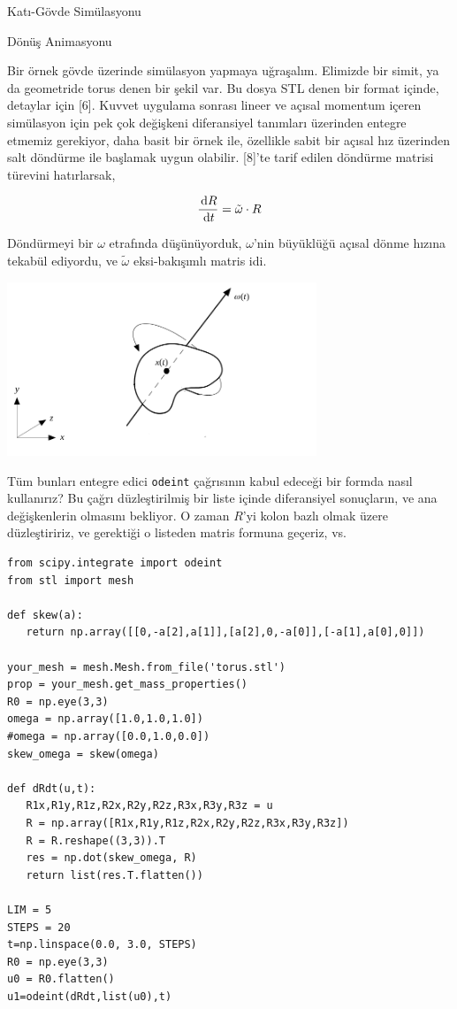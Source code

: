 \documentclass[12pt,fleqn]{article}\usepackage{../../common}
\begin{document}

Katı-Gövde Simülasyonu

Dönüş Animasyonu

Bir örnek gövde üzerinde simülasyon yapmaya uğraşalım. Elimizde bir simit, ya da
geometride torus denen bir şekil var. Bu dosya STL denen bir format içinde,
detaylar için [6]. Kuvvet uygulama sonrası lineer ve açısal momentum içeren
simülasyon için pek çok değişkeni diferansiyel tanımları üzerinden entegre
etmemiz gerekiyor, daha basit bir örnek ile, özellikle sabit bir açısal hız
üzerinden salt döndürme ile başlamak uygun olabilir. [8]'te tarif edilen
döndürme matrisi türevini hatırlarsak,

$$
\frac{\,\mathrm{d} R}{\,\mathrm{d} t} = \tilde \omega \cdot R
$$

Döndürmeyi bir $\omega$ etrafında düşünüyorduk, $\omega$'nin büyüklüğü
açısal dönme hızına tekabül ediyordu, ve $\tilde \omega$ eksi-bakışımlı
matris idi.

\includegraphics[width=25em]{compscieng_bpp32sim_rigbod_01.png}

Tüm bunları entegre edici \verb!odeint! çağrısının kabul edeceği bir formda
nasıl kullanırız? Bu çağrı düzleştirilmiş bir liste içinde diferansiyel
sonuçların, ve ana değişkenlerin olmasını bekliyor. O zaman $R$'yi kolon bazlı
olmak üzere düzleştiririz, ve gerektiği o listeden matris formuna geçeriz, vs.

\begin{verbatim}
from scipy.integrate import odeint
from stl import mesh

def skew(a):
   return np.array([[0,-a[2],a[1]],[a[2],0,-a[0]],[-a[1],a[0],0]])

your_mesh = mesh.Mesh.from_file('torus.stl')
prop = your_mesh.get_mass_properties()
R0 = np.eye(3,3)
omega = np.array([1.0,1.0,1.0])
#omega = np.array([0.0,1.0,0.0])
skew_omega = skew(omega)
   
def dRdt(u,t):   
   R1x,R1y,R1z,R2x,R2y,R2z,R3x,R3y,R3z = u
   R = np.array([R1x,R1y,R1z,R2x,R2y,R2z,R3x,R3y,R3z])
   R = R.reshape((3,3)).T
   res = np.dot(skew_omega, R)
   return list(res.T.flatten())

LIM = 5
STEPS = 20
t=np.linspace(0.0, 3.0, STEPS)
R0 = np.eye(3,3)
u0 = R0.flatten()
u1=odeint(dRdt,list(u0),t)
\end{verbatim}
\end{document}
